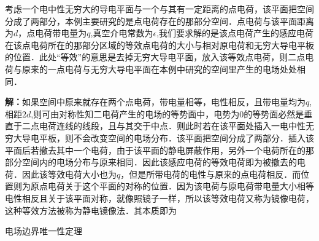 \begin{example}{}
考虑一个电中性无穷大的导电平面与一个与其有一定距离的点电荷，该平面把空间分成了两部分，本例主要研究的是点电荷存在的那部分空间．点电荷与该平面距离为$d$，点电荷带电量为$q$,真空介电常数为$\epsilon$,我们要求解的是该点电荷产生的感应电荷在该点电荷所在的那部分区域的等效点电荷的大小与相对原电荷和无穷大导电平板的位置．此处“等效”的意思是去掉无穷大导电平面，放入该等效点电荷，则二点电荷与原来的一点电荷与无穷大导电平面在本例中研究的空间里产生的电场处处相同．

\textbf{解：}如果空间中原来就存在两个点电荷，带电量相等，电性相反，且带电量均为$q$,相距$2d$,则可由对称性知二电荷产生的电场的等势面中，电势为$0$的等势面必然是垂直于二点电荷连线的线段，且与其交于中点．则此时若在该平面处插入一电中性无穷大导电平板，则不会改变空间的电场分布．该平面把空间分成了两部分．插入该平面后若撤去其中一个电荷，由于该平面的静电屏蔽作用，另外一个电荷所在的那部分空间内的电场分布与原来相同．因此该感应电荷的等效电荷即为被撤去的电荷．因此该等效电荷大小也为$q$，但是所带电荷的电性与原来的点电荷相反．而位置则为原点电荷关于这个平面的对称的位置．因为该电荷与原电荷带电量大小相等电性相反且关于该平面对称，就像照镜子一样，所以该等效电荷又称为镜像电荷，这种等效方法被称为静电镜像法．其本质即为
\end{example}

\begin{theorem}{电场边界唯一性定理}

\end{theorem}
